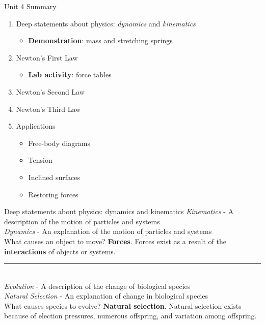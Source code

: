 \documentclass{beamer}
\begin{document}
\begin{frame}{Unit 4 Summary}
\begin{enumerate}
\item Deep statements about physics: \textit{dynamics} and \textit{kinematics}
\begin{itemize}
\item \textbf{Demonstration}: mass and stretching springs
\end{itemize}
\item Newton's \alert{First Law}
\begin{itemize}
\item \textbf{Lab activity}: force tables
\end{itemize}
\item Newton's \alert{Second Law}
\item Newton's \alert{Third Law}
\item Applications
\begin{itemize}
\item Free-body diagrams
\item Tension
\item Inclined surfaces
\item Restoring forces
\end{itemize}
\end{enumerate}
\end{frame}

\begin{frame}{Deep statements about physics: dynamics and kinematics}
\small
\textit{Kinematics} - A \alert{description} of the motion of particles and systems \\
\textit{Dynamics} - An \alert{explanation} of the motion of particles and systems \\
\vspace{0.25cm}
What causes an object to move?  \textbf{Forces}.  Forces exist as a result of the \alert{\textbf{interactions}} of objects or systems.\\
\vspace{0.25cm}
\rule{10cm}{0.4pt} \\
\vspace{0.25cm}
\textit{Evolution} - A \alert{description} of the change of biological species \\
\textit{Natural Selection} - An \alert{explanation} of change in biological species \\
\vspace{0.25cm}
What causes species to evolve?  \textbf{Natural selection}.  Natural selection exists because of \alert{election pressures}, \alert{numerous offspring}, and \alert{variation} among offspring.
\end{frame}
\end{document}
